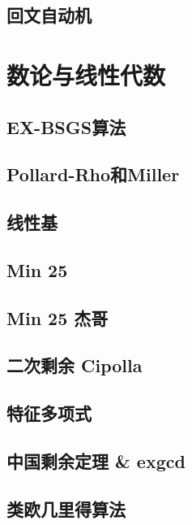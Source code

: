 \documentclass[a4paper,12pt]{article}
\begin{document}
\subsection{回文自动机}


\section{数论与线性代数}

\subsection{EX-BSGS算法}

\subsection{Pollard-Rho和Miller}

\subsection{线性基}


\subsection{Min 25}

\subsection{Min 25 杰哥}

\subsection{二次剩余 Cipolla}

\subsection{特征多项式}

\subsection{中国剩余定理 \& exgcd}

\subsection{类欧几里得算法}

\end{document}
